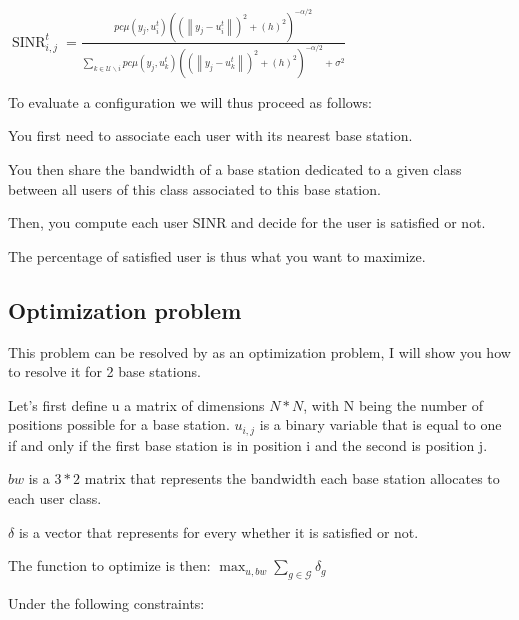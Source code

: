 \documentclass[letterpaper]{article}
\begin{document}
\begin{multicols}{2}
$\operatorname{SINR}_{i, j}^t=\frac{p c \mu\left(y_j, u_i^t\right)\left(\left(\left\|y_j-u_i^t\right\|\right)^2+\left(h\right)^2\right)^{-\alpha / 2}}{\sum\limits_{k \in \mathcal{U} \backslash i} p c \mu\left(y_j, u_k^t\right)\left(\left(\left\|y_j-u_k^t\right\|\right)^2+\left(h\right)^2\right)^{-\alpha / 2}+\sigma^2}$

To evaluate a configuration we will thus proceed as follows:

You first need to associate each user with its nearest base station.

You then share the bandwidth of a base station dedicated to a given class between all users of this class associated to this base station.

Then, you compute each user SINR and decide for the user is satisfied or not.

The percentage of satisfied user is thus what you want to maximize.

\subsection{Optimization problem}

This problem can be resolved by as an optimization problem, I will show you how to resolve it for 2 base stations.

Let's first define u a matrix of dimensions $N*N$, with N being the number of positions possible for a base station.
$u_{i,j}$ is a binary variable that is equal to one if and only if the first base station is in position i and the second is position j.

$bw$ is a $3*2$ matrix that represents the bandwidth each base station allocates to each user class.

$\delta$ is a vector that represents for every whether it is satisfied or not.

The function to optimize is then: $\max_{u,bw}\sum_{g\in\mathcal{G}}\delta_g$

Under the following constraints:


\end{multicols}
\end{document}
